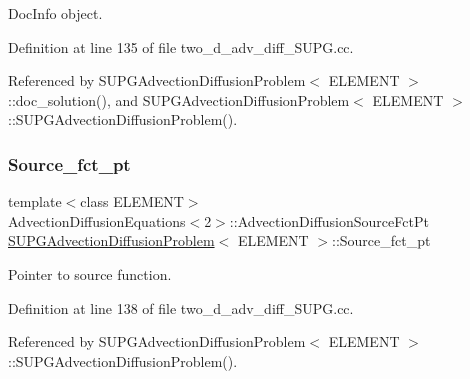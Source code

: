 Doc\+Info object. 



Definition at line 135 of file two\+\_\+d\+\_\+adv\+\_\+diff\+\_\+\+S\+U\+P\+G.\+cc.



Referenced by S\+U\+P\+G\+Advection\+Diffusion\+Problem$<$ E\+L\+E\+M\+E\+N\+T $>$\+::doc\+\_\+solution(), and S\+U\+P\+G\+Advection\+Diffusion\+Problem$<$ E\+L\+E\+M\+E\+N\+T $>$\+::\+S\+U\+P\+G\+Advection\+Diffusion\+Problem().

\mbox{\label{classSUPGAdvectionDiffusionProblem_a9bf04de8641dd4151514c2e2603f3ac5}} 
\subsubsection{\texorpdfstring{Source\+\_\+fct\+\_\+pt}{Source\_fct\_pt}}
{\footnotesize\ttfamily template$<$class E\+L\+E\+M\+E\+NT$>$ \\
Advection\+Diffusion\+Equations$<$2$>$\+::Advection\+Diffusion\+Source\+Fct\+Pt \hyperlink{classSUPGAdvectionDiffusionProblem}{S\+U\+P\+G\+Advection\+Diffusion\+Problem}$<$ E\+L\+E\+M\+E\+NT $>$\+::Source\+\_\+fct\+\_\+pt\hspace{0.3cm}{\ttfamily [private]}}



Pointer to source function. 



Definition at line 138 of file two\+\_\+d\+\_\+adv\+\_\+diff\+\_\+\+S\+U\+P\+G.\+cc.



Referenced by S\+U\+P\+G\+Advection\+Diffusion\+Problem$<$ E\+L\+E\+M\+E\+N\+T $>$\+::\+S\+U\+P\+G\+Advection\+Diffusion\+Problem().

\mbox{\label{classSUPGAdvectionDiffusionProblem_ab8c19428c17ac7d8bb776e91940734bd}} 
